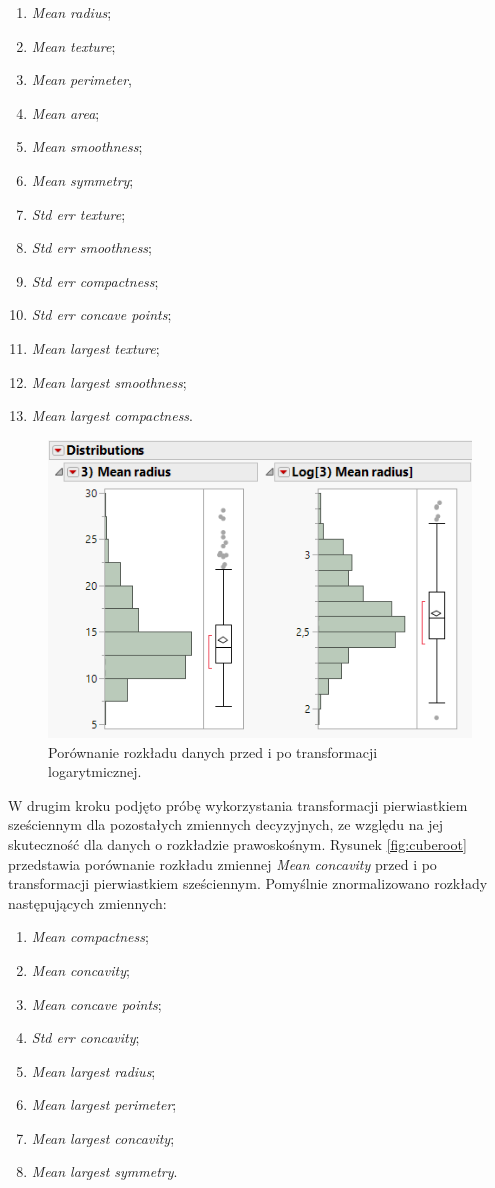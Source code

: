 	\begin{enumerate}
		\item \textit{Mean radius};
		\item \textit{Mean texture};
		\item \textit{Mean perimeter},
		\item \textit{Mean area};
		\item \textit{Mean smoothness};
		\item \textit{Mean symmetry};
		\item \textit{Std err texture};
		\item \textit{Std err smoothness};
		\item \textit{Std err compactness};
		\item \textit{Std err concave points};
		\item \textit{Mean largest texture};
		\item \textit{Mean largest smoothness};
		\item \textit{Mean largest compactness}.
	\end{enumerate}

	\begin{figure}[!ht]
		\centering
		\includegraphics[width=0.7\linewidth]{Rysunki/Rozdzial3/log}
		\caption{Porównanie rozkładu danych przed i po transformacji logarytmicznej.}
		\label{fig:log}
	\end{figure}

	W drugim kroku podjęto próbę wykorzystania transformacji pierwiastkiem sześciennym dla pozostałych zmiennych decyzyjnych, ze względu na jej skuteczność dla danych o rozkładzie prawoskośnym. Rysunek \ref{fig:cuberoot} przedstawia porównanie rozkładu zmiennej \textit{Mean concavity} przed i po transformacji pierwiastkiem sześciennym. Pomyślnie znormalizowano rozkłady następujących zmiennych:
	
	\begin{enumerate}
		\item \textit{Mean compactness};
		\item \textit{Mean concavity};
		\item \textit{Mean concave points};
		\item \textit{Std err concavity};
		\item \textit{Mean largest radius};
		\item \textit{Mean largest perimeter};
		\item \textit{Mean largest concavity};
		\item \textit{Mean largest symmetry}.
	\end{enumerate} 

